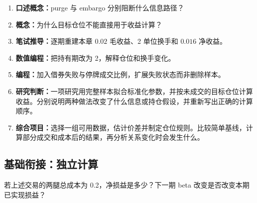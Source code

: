 \begin{enumerate}[leftmargin=*]
  \item \textbf{口述概念：}purge 与 embargo 分别阻断什么信息路径？
  \item \textbf{概念：}为什么目标仓位不能直接用于收益计算？
  \item \textbf{笔试推导：}逐期重建本章 $0.02$ 毛收益、2 单位换手和 $0.016$ 净收益。
  \item \textbf{数值编程：}把持有期改为 2，解释仓位和换手变化。
  \item \textbf{编程：}加入借券失败与停牌成交比例，扩展失败状态而非删除样本。
  \item \textbf{研究判断：}一项研究用完整样本拟合标准化参数，并按未成交的目标仓位计算收益。分别说明两种做法改变了什么信息或持仓假设，并重新写出正确的计算顺序。
  \item \textbf{综合项目：}选择一组可用数据，估计价差并制定仓位规则。比较简单基线，计算部分成交和成本后的结果，再分析关系变化时会发生什么。
\end{enumerate}

\subsection*{基础衔接：独立计算}
若上述交易的两腿总成本为 0.2，净损益是多少？下一期 beta 改变是否改变本期已实现损益？
